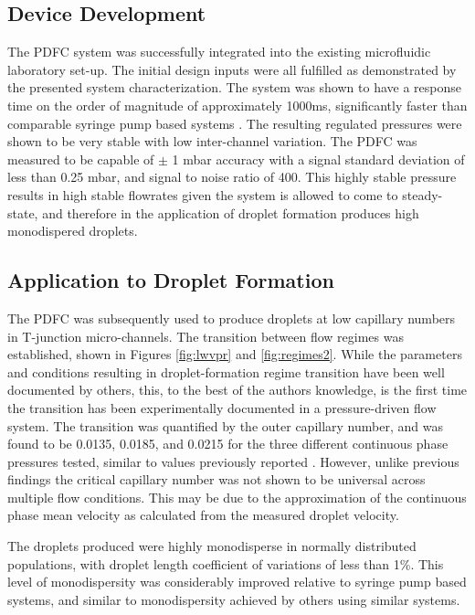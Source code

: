 \subsection{Device Development}

The PDFC system was successfully integrated into the existing microfluidic laboratory set-up. The initial design inputs were all fulfilled as demonstrated by the presented system characterization. The system was shown to have a response time on the order of magnitude of approximately 1000ms, significantly faster than comparable syringe pump based systems \cite{Bong2011}. The resulting regulated pressures were shown to be very stable with low inter-channel variation. The PDFC was measured to be capable of $\pm$ 1 mbar accuracy with a signal standard deviation of less than 0.25 mbar, and signal to noise ratio of 400. This highly stable pressure results in high stable flowrates given the system is allowed to come to steady-state, and therefore in the application of droplet formation produces high monodispered droplets.

\subsection{Application to Droplet Formation}
The PDFC was subsequently used to produce droplets at low capillary numbers in T-junction micro-channels. The transition between flow regimes was established, shown in Figures \vref{fig:lwvpr} and \vref{fig:regimes2}. While the parameters and conditions resulting in droplet-formation regime transition have been well documented by others, this, to the best of the authors knowledge, is the first time the transition has been experimentally documented in a pressure-driven flow system. The transition was quantified by the outer capillary number, and was found to be 0.0135, 0.0185, and 0.0215 for the three different continuous phase pressures tested, similar to values previously reported \cite{Christopher2008,DeMenech2008}. However, unlike previous findings the critical capillary number was not shown to be universal across multiple flow conditions. This may be due to the approximation of the continuous phase mean velocity as calculated from the measured droplet velocity. 

The droplets produced were highly monodisperse in normally distributed populations, with droplet length coefficient of variations of less than 1\%. This level of monodispersity was considerably improved relative to syringe pump based systems, and similar to monodispersity achieved by others using similar systems\cite{Kaminski2016, Lim2015}.
